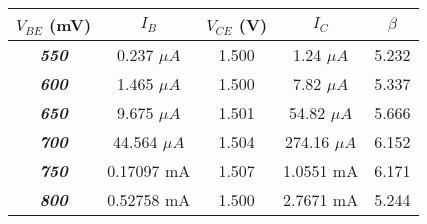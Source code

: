 \begin{tabular}{ccccc}
\hline
\textbf{$V_{BE}$ (mV)} & \textbf{$I_{B}$} & \textbf{$V_{CE}$ (V)} & \textbf{$I_{C}$} & $\beta$\\ \hline
\textit{\textbf{550}} & 0.237 $\mu A$ & 1.500  & 1.24  $\mu A$ & 5.232 \\
\textit{\textbf{600}} & 1.465 $\mu A$ & 1.500  & 7.82  $\mu A$ & 5.337 \\
\textit{\textbf{650}} & 9.675 $\mu A$ & 1.501 & 54.82 $\mu A$ & 5.666 \\
\textit{\textbf{700}} & 44.564 $\mu A$ &1.504  & 274.16  $\mu A$ & 6.152\\
\textit{\textbf{750}} & 0.17097 mA & 1.507  & 1.0551 mA  & 6.171\\
\textit{\textbf{800}} & 0.52758 mA & 1.500  & 2.7671 mA & 5.244\\\hline
\end{tabular}